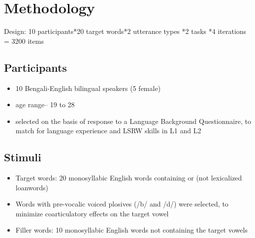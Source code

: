 \documentclass[11pt]{article}
\newcommand{\nt}[1]{\textipa{[#1]}} %
\begin{document}
\section{Methodology} %
Design: 10 participants*20 target words*2 utterance types *2 tasks *4 iterations = 3200 items

\subsection{Participants}

\begin{itemize}
	\item 10 Bengali-English bilingual speakers (5 female)
	\item age range-- 19 to 28
	\item selected on the basis of response to a Language Background Questionnaire, to match for language experience and LSRW skills in L1 and L2 
\end{itemize}

\subsection{Stimuli}
\begin{itemize}
	\item Target words: 20 monosyllabic English words containing \nt{2} or \nt{ae} (not lexicalized loanwords)
	\item Words with pre-vocalic voiced plosives (/b/ and /d/) were selected, to minimize coarticulatory effects on the target vowel
	\item Filler words: 10 monosyllabic English words not containing the target vowels
\end{itemize}
\end{document}
